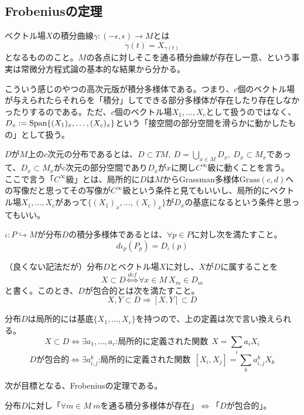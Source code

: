\subsection{Frobeniusの定理}
\begin{rem}[積分曲線]
    ベクトル場$X$の積分曲線$\gamma:(-\epsilon,\epsilon)\to M$とは
    \[\Dot{\gamma}(t)=X_{\gamma(t)}\]
    となるもののこと。$M$の各点に対しそこを通る積分曲線が存在し一意、という事実は常微分方程式論の基本的な結果から分かる。
\end{rem}
こういう感じのやつの高次元版が積分多様体である。つまり、$c$個のベクトル場が与えられたらそれらを「積分」してできる部分多様体が存在したり存在しなかったりするのである。ただ、$c$個のベクトル場$X_1,\dots,X_c$として扱うのではなく、$D_x:=\mathrm{Span}\{(X_1)_x,\dots,(X_c)_x\}$という「接空間の部分空間を滑らかに動かしたもの」として扱う。
\begin{defi}[分布]
    $D$が$M$上の$c$次元の分布であるとは、$\displaystyle D\subset TM,\ D=\bigcup_{x\in M}D_x,\ D_x\subset M_x$であって、$D_x\subset M_x$が$c$次元の部分空間であり$D_x$が$x$に関し$C^\infty$級に動くことを言う。\\
    ここで言う「$C^\infty$級」とは、局所的に$D$は$M$からGrassman多様体$\mathrm{Grass}(c,d)$への写像だと思ってその写像が$C^\infty$級という条件と見てもいいし、局所的にベクトル場$X_1,\dots,X_c$があって$\{(X_1)_x,\dots,(X_c)_x\}$が$D_x$の基底になるという条件と思ってもいい。
\end{defi}
\begin{defi}[積分多様体]
    $\iota:P\hookrightarrow M$が分布$D$の積分多様体であるとは、$\forall p\in P$に対し次を満たすこと。
    \[d\iota_p(P_p)=D_\iota(p)\]
\end{defi}
\begin{defi}[包合的]
    （良くない記法だが）分布$D$とベクトル場$X$に対し、$X$が$D$に属することを
    \[X\subset D\overset{def}{\iff}\forall x\in M\ X_m\in D_m\]
    と書く。このとき、$D$が包合的とは次を満たすこと。
    \[X,Y\subset D\Rightarrow [X,Y]\subset D\]
\end{defi}
\begin{rem}[基底だけ見ればいい]\label{rem:121}
    分布$D$は局所的には基底$\{X_1,\dots,X_c\}$を持つので、上の定義は次で言い換えられる。
    \[X\subset D\iff \exists a_1,\dots,a_c\text{:局所的に定義された関数}\ \ X=\sum_i a_iX_i\]
    \[D\text{が包合的}\iff \exists a_{i,j}^k\text{:局所的に定義された関数}\ \ [X_i,X_j]=\sum_k a_{i,j}^k X_k\]
\end{rem}
次が目標となる、Frobeniusの定理である。
\begin{thm}[Frobenius]\label{thm:121}
    分布$D$に対し「$\forall m\in M\ m$を通る積分多様体が存在」$\iff$「$D$が包合的」。
\end{thm}
